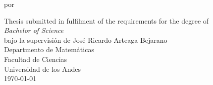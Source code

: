 \begin{titlepage}
\begin{center}

\Huge
\makeatletter
\textbf{\@title}

\Large

\vspace{3.cm}

por \textbf{\@author{}}

\vfill
\large
Thesis submitted in fulfilment of the requirements for the degree of\\
\textit{Bachelor of Science}\\
bajo la supervisión de José Ricardo Arteaga Bejarano\\
\vfill
\large
Departmento de Matemáticas\\
Facultad de Ciencias\\
Universidad de los Andes\\

\today
\makeatother

\end{center}
\end{titlepage}
